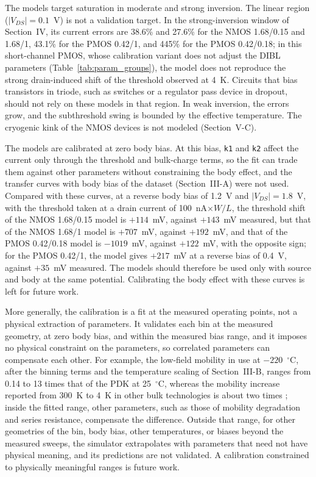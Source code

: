 \documentclass[a4paper,10pt,twoside,twocolumn,final]{JICS_LaTexGuidelines} %
\begin{document}
The models target saturation in moderate and strong inversion. The linear region ($|V_{DS}|=0.1$~V) is not a validation target. In the strong-inversion window of Section~IV, its current errors are 38.6\% and 27.6\% for the NMOS 1.68/0.15 and 1.68/1, 43.1\% for the PMOS 0.42/1, and 445\% for the PMOS 0.42/0.18; in this short-channel PMOS, whose calibration variant does not adjust the DIBL parameters (Table~\ref{tab:param_groups}), the model does not reproduce the strong drain-induced shift of the threshold observed at 4~K. Circuits that bias transistors in triode, such as switches or a regulator pass device in dropout, should not rely on these models in that region. In weak inversion, the errors grow, and the subthreshold swing is bounded by the effective temperature. The cryogenic kink of the NMOS devices is not modeled (Section~V-C).

The models are calibrated at zero body bias. At this bias, \texttt{k1} and \texttt{k2} affect the current only through the threshold and bulk-charge terms, so the fit can trade them against other parameters without constraining the body effect, and the transfer curves with body bias of the dataset (Section~III-A) were not used. Compared with these curves, at a reverse body bias of 1.2~V and $|V_{DS}|=1.8$~V, with the threshold taken at a drain current of 100~nA$\times W/L$, the threshold shift of the NMOS 1.68/0.15 model is $+114$~mV, against $+143$~mV measured, but that of the NMOS 1.68/1 model is $+707$~mV, against $+192$~mV, and that of the PMOS 0.42/0.18 model is $-1019$~mV, against $+122$~mV, with the opposite sign; for the PMOS 0.42/1, the model gives $+217$~mV at a reverse bias of 0.4~V, against $+35$~mV measured. The models should therefore be used only with source and body at the same potential. Calibrating the body effect with these curves is left for future work.

More generally, the calibration is a fit at the measured operating points, not a physical extraction of parameters. It validates each bin at the measured geometry, at zero body bias, and within the measured bias range, and it imposes no physical constraint on the parameters, so correlated parameters can compensate each other. For example, the low-field mobility in use at $-220$~$^\circ$C, after the binning terms and the temperature scaling of Section~III-B, ranges from 0.14 to 13 times that of the PDK at 25~$^\circ$C, whereas the mobility increase reported from 300~K to 4~K in other bulk technologies is about two times \cite{b4}; inside the fitted range, other parameters, such as those of mobility degradation and series resistance, compensate the difference. Outside that range, for other geometries of the bin, body bias, other temperatures, or biases beyond the measured sweeps, the simulator extrapolates with parameters that need not have physical meaning, and its predictions are not validated. A calibration constrained to physically meaningful ranges is future work.
\end{document}
